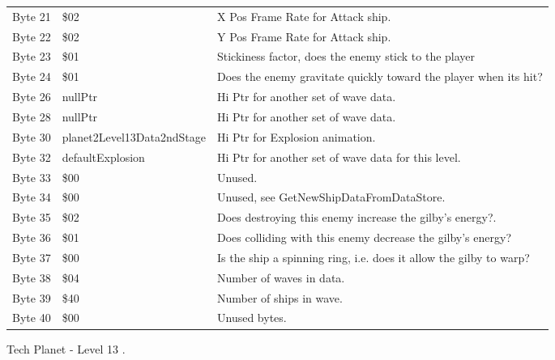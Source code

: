 \begin{figure}[H]
{\begin{adjustbox}{width=12cm}
\begin{tabular}{lll}
 Byte 21 & \$02                        & X Pos Frame Rate for Attack ship.                                  \\
 Byte 22 & \$02                        & Y Pos Frame Rate for Attack ship.                                  \\
 Byte 23 & \$01                        & Stickiness factor, does the enemy stick to the player              \\
 Byte 24 & \$01                        & Does the enemy gravitate quickly toward the player when its hit?   \\
 Byte 26 & nullPtr                    & Hi Ptr for another set of wave data.                               \\
 Byte 28 & nullPtr                    & Hi Ptr for another set of wave data.                               \\
 Byte 30 & planet2Level13Data2ndStage & Hi Ptr for Explosion animation.                                    \\
 Byte 32 & defaultExplosion           & Hi Ptr for another set of wave data for this level.                \\
 Byte 33 & \$00                        & Unused.                                                            \\
 Byte 34 & \$00                        & Unused, see GetNewShipDataFromDataStore.                           \\
 Byte 35 & \$02                        & Does destroying this enemy increase the gilby's energy?.           \\
 Byte 36 & \$01                        & Does colliding with this enemy decrease the gilby's energy?        \\
 Byte 37 & \$00                        & Is the ship a spinning ring, i.e. does it allow the gilby to warp? \\
 Byte 38 & \$04                        & Number of waves in data.                                           \\
 Byte 39 & \$40                        & Number of ships in wave.                                           \\
 Byte 40 & \$00                        & Unused bytes.                                                      \\
\bottomrule
\end{tabular}

  \end{adjustbox}

  }\caption*{Tech Planet - Level 13
.}
\end{figure}

